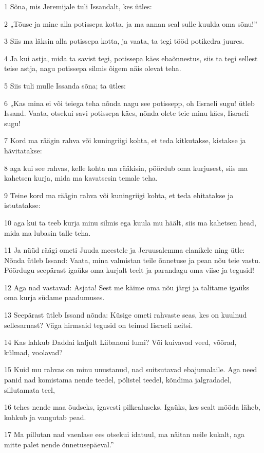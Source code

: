 \par 1 Sõna, mis Jeremijale tuli Issandalt, kes ütles:
\par 2 „Tõuse ja mine alla potissepa kotta, ja ma annan seal sulle kuulda oma sõnu!”
\par 3 Siis ma läksin alla potissepa kotta, ja vaata, ta tegi tööd potikedra juures.
\par 4 Ja kui astja, mida ta savist tegi, potissepa käes ebaõnnestus, siis ta tegi sellest teise astja, nagu potissepa silmis õigem näis olevat teha.
\par 5 Siis tuli mulle Issanda sõna; ta ütles:
\par 6 „Kas mina ei või teiega teha nõnda nagu see potissepp, oh Iisraeli sugu! ütleb Issand. Vaata, otsekui savi potissepa käes, nõnda olete teie minu käes, Iisraeli sugu!
\par 7 Kord ma räägin rahva või kuningriigi kohta, et teda kitkutakse, kistakse ja hävitatakse:
\par 8 aga kui see rahvas, kelle kohta ma rääkisin, pöördub oma kurjusest, siis ma kahetsen kurja, mida ma kavatsesin temale teha.
\par 9 Teine kord ma räägin rahva või kuningriigi kohta, et teda ehitatakse ja istutatakse:
\par 10 aga kui ta teeb kurja minu silmis ega kuula mu häält, siis ma kahetsen head, mida ma lubasin talle teha.
\par 11 Ja nüüd räägi ometi Juuda meestele ja Jeruusalemma elanikele ning ütle: Nõnda ütleb Issand: Vaata, mina valmistan teile õnnetuse ja pean nõu teie vastu. Pöördugu seepärast igaüks oma kurjalt teelt ja parandagu oma viise ja tegusid!
\par 12 Aga nad vastavad: Asjata! Sest me käime oma nõu järgi ja talitame igaüks oma kurja südame paadumuses.
\par 13 Seepärast ütleb Issand nõnda: Küsige ometi rahvaste seas, kes on kuulnud sellesarnast? Väga hirmsaid tegusid on teinud Iisraeli neitsi.
\par 14 Kas lahkub Ðaddai kaljult Liibanoni lumi? Või kuivavad veed, võõrad, külmad, voolavad?
\par 15 Kuid mu rahvas on minu unustanud, nad suitsutavad ebajumalaile. Aga need panid nad komistama nende teedel, põlistel teedel, kõndima jalgradadel, sillutamata teel,
\par 16 tehes nende maa õudseks, igavesti pilkealuseks. Igaüks, kes sealt mööda läheb, kohkub ja vangutab pead.
\par 17 Ma pillutan nad vaenlase ees otsekui idatuul, ma näitan neile kukalt, aga mitte palet nende õnnetusepäeval.”
